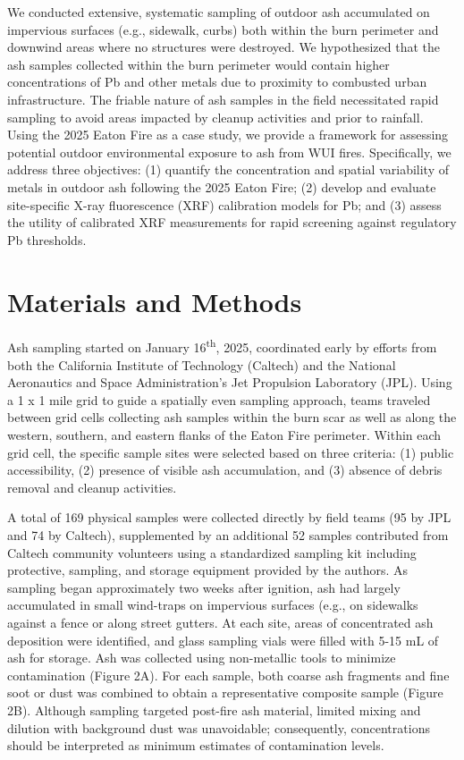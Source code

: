 \documentclass[
  journal=esthag,        %
  manuscript=article,    %
  layout=onecolumn       %
]{achemso}
\begin{document}
We conducted extensive, systematic sampling of outdoor ash accumulated on impervious surfaces (e.g., sidewalk, curbs) both within the burn perimeter and downwind areas where no structures were destroyed. We hypothesized that the ash samples collected within the burn perimeter would contain higher concentrations of Pb and other metals due to proximity to combusted urban infrastructure. The friable nature of ash samples in the field necessitated rapid sampling to avoid areas impacted by cleanup activities and prior to rainfall. Using the 2025 Eaton Fire as a case study, we provide a framework for assessing potential outdoor environmental exposure to ash from WUI fires. Specifically, we address three objectives: (1) quantify the concentration and spatial variability of metals in outdoor ash following the 2025 Eaton Fire; (2) develop and evaluate site-specific X-ray fluorescence (XRF) calibration models for Pb; and (3) assess the utility of calibrated XRF measurements for rapid screening against regulatory Pb thresholds. 


\section{Materials and Methods}

Ash sampling started on January 16\textsuperscript{th}, 2025, coordinated early by efforts from both the California Institute of Technology (Caltech) and the National Aeronautics and Space Administration’s Jet Propulsion Laboratory (JPL). Using a 1 x 1 mile grid to guide a spatially even sampling approach, teams traveled between grid cells collecting ash samples within the burn scar as well as along the western, southern, and eastern flanks of the Eaton Fire perimeter. Within each grid cell, the specific sample sites were selected based on three criteria: (1) public accessibility, (2) presence of visible ash accumulation, and (3) absence of debris removal and cleanup activities. 

A total of 169 physical samples were collected directly by field teams (95 by JPL and 74 by Caltech), supplemented by an additional 52 samples contributed from Caltech community volunteers using a standardized sampling kit including protective, sampling, and storage equipment provided by the authors. As sampling began approximately two weeks after ignition, ash had largely accumulated in small wind-traps on impervious surfaces (e.g., on sidewalks against a fence or along street gutters. At each site, areas of concentrated ash deposition were identified, and glass sampling vials were filled with 5-15 mL of ash for storage. Ash was collected using non-metallic tools to minimize contamination (Figure 2A). For each sample, both coarse ash fragments and fine soot or dust was combined to obtain a representative composite sample (Figure 2B). Although sampling targeted post-fire ash material, limited mixing and dilution with background dust was unavoidable; consequently, concentrations should be interpreted as minimum estimates of contamination levels. 
\end{document}
